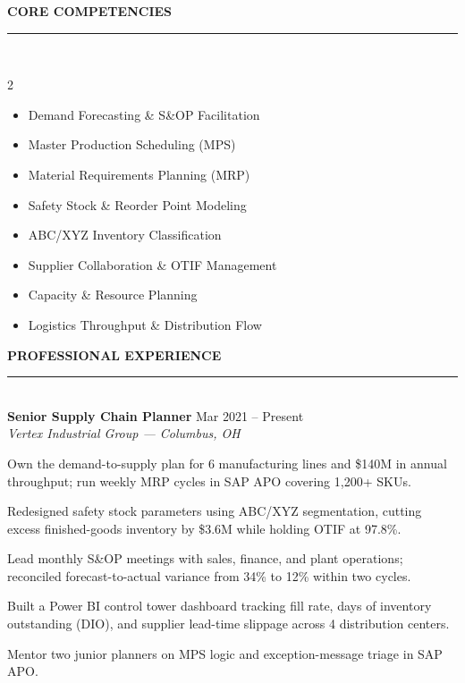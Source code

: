 \documentclass[10pt]{article}
\newcommand{\sectiontitle}[1]{%
  \vspace{2pt}
  {\color{navy}\fontsize{11.5}{13}\selectfont\bfseries #1}\\[-5pt]
  {\color{accent}\rule{\linewidth}{1.1pt}}\\[1pt]
}
\newcommand{\jobheader}[3]{%
  \textbf{\color{navy}\fontsize{10}{11}\selectfont #1} \hfill {\color{graytext}\small #3}\\{}
  \textit{\color{accent}\small #2}\\[0pt]
}
\begin{document}
\sectiontitle{CORE COMPETENCIES}
\begin{multicols}{2}
\small
\begin{itemize}[leftmargin=13pt,itemsep=1pt,topsep=0pt,parsep=0pt,label=\textcolor{accent}{\scriptsize\faCircle}]
  \item Demand Forecasting \& S\&OP Facilitation
  \item Master Production Scheduling (MPS)
  \item Material Requirements Planning (MRP)
  \item Safety Stock \& Reorder Point Modeling
  \item ABC/XYZ Inventory Classification
  \item Supplier Collaboration \& OTIF Management
  \item Capacity \& Resource Planning
  \item Logistics Throughput \& Distribution Flow
\end{itemize}
\end{multicols}

\vspace{-8pt}

\sectiontitle{PROFESSIONAL EXPERIENCE}

\jobheader{Senior Supply Chain Planner}{Vertex Industrial Group --- Columbus, OH}{Mar 2021 -- Present}
\begin{achieve}
  \item Own the demand-to-supply plan for 6 manufacturing lines and \$140M in annual throughput; run weekly MRP cycles in SAP APO covering 1,200+ SKUs.
  \item Redesigned safety stock parameters using ABC/XYZ segmentation, cutting excess finished-goods inventory by \$3.6M while holding OTIF at 97.8\%.
  \item Lead monthly S\&OP meetings with sales, finance, and plant operations; reconciled forecast-to-actual variance from 34\% to 12\% within two cycles.
  \item Built a Power BI control tower dashboard tracking fill rate, days of inventory outstanding (DIO), and supplier lead-time slippage across 4 distribution centers.
  \item Mentor two junior planners on MPS logic and exception-message triage in SAP APO.
\end{achieve}
\end{document}
